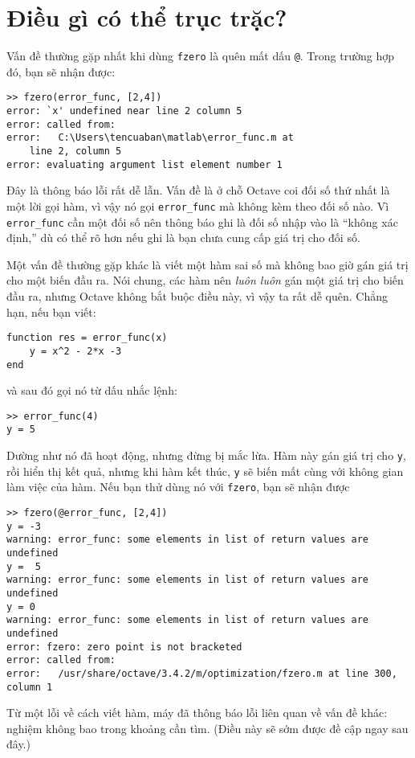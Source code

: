 \documentclass[12pt]{book}
\begin{document}
\section{Điều gì có thể trục trặc?}

Vấn đề thường gặp nhất khi dùng {\tt fzero} là quên mất dấu
{\tt @}. Trong trường hợp đó, bạn sẽ nhận được:

\begin{verbatim}
>> fzero(error_func, [2,4])
error: `x' undefined near line 2 column 5
error: called from:
error:   C:\Users\tencuaban\matlab\error_func.m at 
	line 2, column 5
error: evaluating argument list element number 1
\end{verbatim}
%
Đây là thông báo lỗi rất dễ lẫn. Vấn đề là ở chỗ Octave coi đối số
thứ nhất là một lời gọi hàm, vì vậy nó gọi \verb#error_func# mà
không kèm theo đối số nào. Vì \verb#error_func# cần một đối số nên
thông báo ghi là đối số nhập vào là ``không xác định,''  dù
có thể rõ hơn nếu ghi là bạn chưa cung cấp giá trị cho đối số.

Một vấn đề thường gặp khác là viết một hàm sai số mà không bao giờ
gán giá trị cho một biến đầu ra. Nói chung, các hàm nên 
{\em luôn luôn} gán một giá trị cho biến đầu ra, nhưng Octave
không bắt buộc điều này, vì vậy ta rất dễ quên. Chẳng hạn, nếu
bạn viết:

\begin{verbatim}
function res = error_func(x)
    y = x^2 - 2*x -3
end
\end{verbatim}
%
và sau đó gọi nó từ dấu nhắc lệnh:

\begin{verbatim}
>> error_func(4)
y = 5
\end{verbatim}

Dường như nó đã hoạt động, nhưng đừng bị mắc lừa. Hàm này
gán giá trị cho {\tt y}, rồi hiển thị kết quả, nhưng khi hàm kết thúc,
{\tt y} sẽ biến mất cùng với không gian làm việc của hàm. Nếu bạn
thử dùng nó với {\tt fzero}, bạn sẽ nhận được

\begin{verbatim}
>> fzero(@error_func, [2,4])
y = -3
warning: error_func: some elements in list of return values are undefined
y =  5
warning: error_func: some elements in list of return values are undefined
y = 0
warning: error_func: some elements in list of return values are undefined
error: fzero: zero point is not bracketed
error: called from:
error:   /usr/share/octave/3.4.2/m/optimization/fzero.m at line 300, column 1
\end{verbatim}
%
Từ một lỗi về cách viết hàm, máy đã thông báo lỗi liên quan về vấn đề
khác: nghiệm không bao trong khoảng cần tìm. (Điều này sẽ sớm được
đề cập ngay sau đây.)
\end{document}
